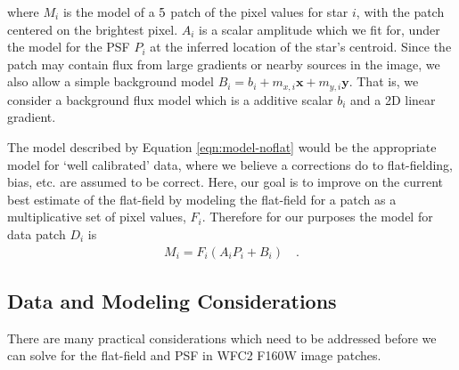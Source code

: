 \documentclass[12pt,preprint,pdftex]{aastex}
\newcommand{\vc}[1]{\mathbf{#1}}
\begin{document}
\noindent where $M_i$ is the model of  a $5\time5$ patch of the pixel values for star $i$, with the patch 
centered on the brightest pixel.  $A_i$ is a scalar amplitude which we fit for, under the model 
for the PSF $P_i$ at the inferred location of the star's centroid.  Since the patch may contain flux from 
large gradients or nearby sources in the image, we also allow a simple background model 
$B_i = b_i + m_{x, i} \vc{x} + m_{y, i} \vc{y}$.  That is, we consider a background flux model 
which is a additive scalar $b_i$ and a 2D linear gradient.  

The model described by Equation \ref{eqn:model-noflat} would be the appropriate model for 
`well calibrated' data, where we believe a corrections do to flat-fielding, bias, etc. are assumed 
to be correct.  Here, our goal is to improve on the current best estimate of the flat-field by modeling 
the flat-field for a patch as a multiplicative set of pixel values, $F_i$.  Therefore for our purposes 
the model for data patch $D_i$ is 
\begin{eqnarray}
M_i = F_i (A_i P_i + B_i)
\quad .
\label{eqn:model-noflat}
\end{eqnarray}

\subsection{Data and Modeling Considerations}

There are many practical considerations which need to be addressed before we can solve 
for the flat-field and PSF in WFC2 F160W image patches.  
\end{document}
